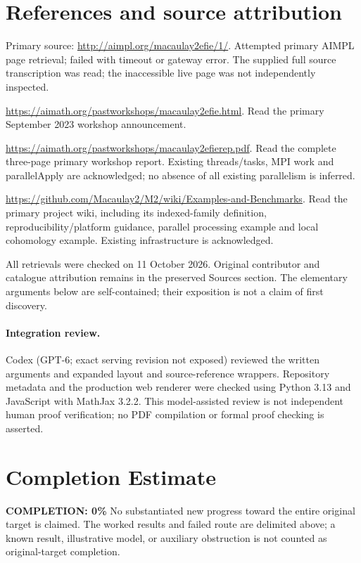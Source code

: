 \documentclass[11pt]{article}
\begin{document}
\section{References and source attribution}
Primary source: \url{http://aimpl.org/macaulay2efie/1/}. Attempted primary AIMPL page retrieval; failed with timeout or gateway error. The supplied full source transcription was read; the inaccessible live page was not independently inspected.

\url{https://aimath.org/pastworkshops/macaulay2efie.html}. Read the primary September 2023 workshop announcement.

\url{https://aimath.org/pastworkshops/macaulay2efierep.pdf}. Read the complete three-page primary workshop report. Existing threads/tasks, MPI work and parallelApply are acknowledged; no absence of all existing parallelism is inferred.

\url{https://github.com/Macaulay2/M2/wiki/Examples-and-Benchmarks}. Read the primary project wiki, including its indexed-family definition, reproducibility/platform guidance, parallel processing example and local cohomology example. Existing infrastructure is acknowledged.

All retrievals were checked on 11 October 2026. Original contributor and catalogue attribution remains in the preserved Sources section. The elementary arguments below are self-contained; their exposition is not a claim of first discovery.


\paragraph{Integration review.} Codex (GPT-6; exact serving revision not exposed) reviewed the written arguments and expanded layout and source-reference wrappers. Repository metadata and the production web renderer were checked using Python 3.13 and JavaScript with MathJax 3.2.2. This model-assisted review is not independent human proof verification; no PDF compilation or formal proof checking is asserted.

\section{Completion Estimate}
\noindent\textbf{COMPLETION: 0\%}
No substantiated new progress toward the entire original target is claimed. The worked results and failed route are delimited above; a known result, illustrative model, or auxiliary obstruction is not counted as original-target completion.
\end{document}
